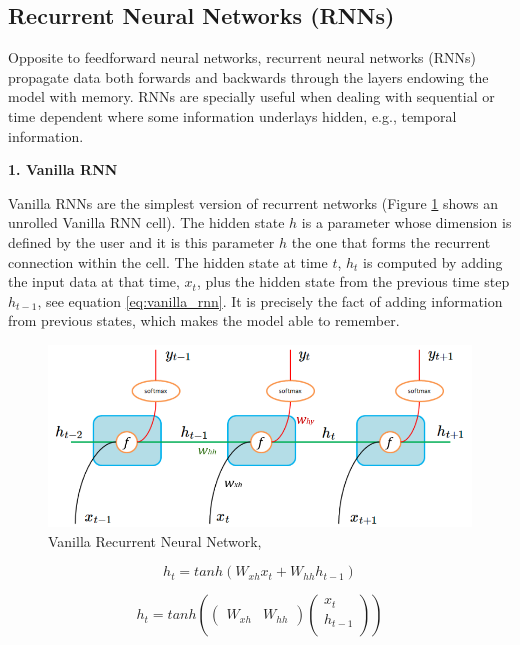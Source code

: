 \subsection{Recurrent Neural Networks (RNNs)}

Opposite to feedforward neural networks, recurrent neural networks (RNNs) propagate data both forwards and backwards through the layers endowing the model with memory. RNNs are specially useful when dealing with sequential or time dependent where some information underlays hidden, e.g., temporal information.

\vspace{5mm} 
\textbf{1. Vanilla RNN}

Vanilla RNNs are the simplest version of recurrent networks (Figure \ref{fig:rnn} shows an unrolled Vanilla RNN cell). The hidden state $h$ is a parameter whose dimension is defined by the user and it is this parameter $h$ the one that forms the recurrent connection within the cell. The hidden state at time $t$, $h_t$ is computed by adding the input data at that time, $x_t$, plus the hidden state from the previous time step $h_{t-1}$, see equation \ref{eq:vanilla_rnn}. It is precisely the fact of adding information from previous states, which makes the model able to remember.

%

\begin{figure}[H]
    \centering
    \includegraphics[width=.7\textwidth]{figures/rnn.png}
    \caption{Vanilla Recurrent Neural Network, \cite{Vanilla-RNN-image}}
    \label{fig:rnn}
\end{figure}



\begin{equation}
h_t=tanh(W_{xh}x_t+W_{hh}h_{t−1})
\end{equation}


\begin{equation}
h_t = tanh\left(\begin{pmatrix}
W_{xh} & W_{hh}
\end{pmatrix}
\begin{pmatrix}
x_t \\
h_{t−1} \\
\end{pmatrix}\right)
\label{eq:vanilla_rnn}
\end{equation}


